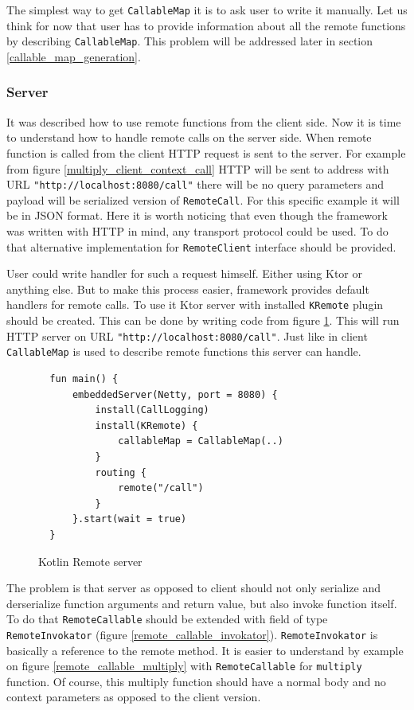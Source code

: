 \documentclass[a4paper,11pt,oneside]{article}
\newcommand{\kotlini}[1]{\texttt{#1}}
\newcommand{\ki}[1]{\kotlini{#1}}
\begin{document}
The simplest way to get \ki{CallableMap} it is to ask user to write it manually. Let us think for now that 
user has to provide information about all the remote functions by describing \kotlini{CallableMap}. 
This problem will be addressed later in section \ref{callable_map_generation}.

\subsubsection{Server}

It was described how to use remote functions from the client side. Now it is time to understand how to
handle remote calls on the server side. When remote function is called from the client HTTP request is 
sent to the server. For example from figure \ref{multiply_client_context_call} HTTP will be sent to address
with URL \kotlini{"http://localhost:8080/call"} there will be no query parameters and payload will be
serialized version of \kotlini{RemoteCall}. For this specific example it will be in JSON format. Here it 
is worth noticing that even though the framework was written with HTTP in mind, any transport protocol 
could be used. To do that alternative implementation for \kotlini{RemoteClient} interface should be provided.

User could write handler for such a request himself. Either using Ktor or anything else. But to make
this process easier, framework provides default handlers for remote calls. To use it Ktor server
with installed \kotlini{KRemote} plugin should be created. This can be done by writing code from figure
\ref{remote_server}. This will run HTTP server on URL \kotlini{"http://localhost:8080/call"}.
Just like in client \kotlini{CallableMap} is used to describe remote functions this server can handle.

\begin{figure}[!h]
  \begin{verbatim}
  fun main() {
      embeddedServer(Netty, port = 8080) {
          install(CallLogging)
          install(KRemote) {
              callableMap = CallableMap(..)
          }
          routing {
              remote("/call")
          }
      }.start(wait = true)
  }
  \end{verbatim}
  \caption{Kotlin Remote server}\label{remote_server}
\end{figure}

The problem is that server as opposed to client should not only serialize and derserialize function
arguments and return value, but also invoke function itself. To do that \kotlini{RemoteCallable}
should be extended with field of type \kotlini{RemoteInvokator} (figure
\ref{remote_callable_invokator}). \kotlini{RemoteInvokator} is basically a reference to the remote
method. It is easier to understand by example on figure \ref{remote_callable_multiply} with
\kotlini{RemoteCallable} for \kotlini{multiply} function. Of course, this multiply function should
have a normal body and no context parameters as opposed to the client version.
\end{document}
